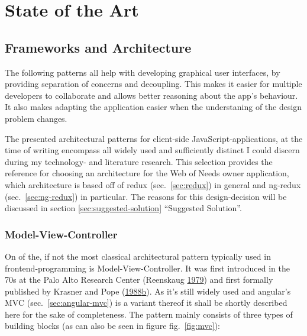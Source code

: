\documentclass[a4paper,,tablecaptionabove]{scrbook}
\begin{document}
\hypertarget{sec:state-of-the-art}{%
\chapter{State of the Art}\label{sec:state-of-the-art}}

\hypertarget{frameworks-and-architecture}{%
\section{Frameworks and
Architecture}\label{frameworks-and-architecture}}

The following patterns all help with developing graphical user
interfaces, by providing separation of concerns and decoupling. This
makes it easier for multiple developers to collaborate and allows better
reasoning about the app's behaviour. It also makes adapting the
application easier when the understaning of the design problem changes.

The presented architectural patterns for client-side
JavaScript-applications, at the time of writing encompass all widely
used and sufficiently distinct I could discern during my technology- and
literature research. This selection provides the reference for choosing
an architecture for the Web of Needs owner application, which
architecture is based off of redux (sec.~\ref{sec:redux}) in general and
ng-redux (sec.~\ref{sec:ng-redux}) in particular. The reasons for this
design-decision will be discussed in section
\ref{sec:suggested-solution} \enquote{Suggested Solution}.

\hypertarget{sec:mvc}{%
\subsection{Model-View-Controller}\label{sec:mvc}}

On of the, if not the most classical architectural pattern typically
used in frontend-programming is Model-View-Controller. It was first
introduced in the 70s at the Palo Alto Research Center (Reenskaug
\protect\hyperlink{ref-ReenskaugThingModelViewEditor1979}{1979}) and
first formally published by Krasner and Pope
(\protect\hyperlink{ref-KrasnerCookbookUsingModelview1988}{1988}\protect\hyperlink{ref-KrasnerCookbookUsingModelview1988}{b}).
As it's still widely used and angular's MVC (sec.~\ref{sec:angular-mvc})
is a variant thereof it shall be shortly described here for the sake of
completeness. The pattern mainly consists of three types of building
blocks (as can also be seen in figure fig.~\ref{fig:mvc}):
\end{document}
